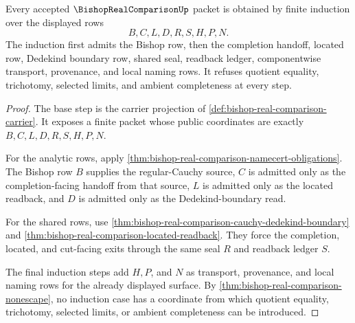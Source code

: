 \begin{theorem}
\label{thm:bishop-real-comparison-source-induction}
Every accepted $\BishopRealComparisonUp$ packet is obtained by finite induction over the displayed rows
$$
B,C,L,D,R,S,H,P,N.
$$
The induction first admits the Bishop row, then the completion handoff, located row, Dedekind boundary row, shared seal, readback ledger, componentwise transport, provenance, and local naming rows. It refuses quotient equality, trichotomy, selected limits, and ambient completeness at every step.
\end{theorem}
\begin{proof}
The base step is the carrier projection of \autoref{def:bishop-real-comparison-carrier}. It exposes a finite packet whose public coordinates are exactly $B,C,L,D,R,S,H,P,N$.

For the analytic rows, apply \autoref{thm:bishop-real-comparison-namecert-obligations}. The Bishop row $B$ supplies the regular-Cauchy source, $C$ is admitted only as the completion-facing handoff from that source, $L$ is admitted only as the located readback, and $D$ is admitted only as the Dedekind-boundary read.

For the shared rows, use \autoref{thm:bishop-real-comparison-cauchy-dedekind-boundary} and \autoref{thm:bishop-real-comparison-located-readback}. They force the completion, located, and cut-facing exits through the same seal $R$ and readback ledger $S$.

The final induction steps add $H,P$, and $N$ as transport, provenance, and local naming rows for the already displayed surface. By \autoref{thm:bishop-real-comparison-nonescape}, no induction case has a coordinate from which quotient equality, trichotomy, selected limits, or ambient completeness can be introduced.
\end{proof}

